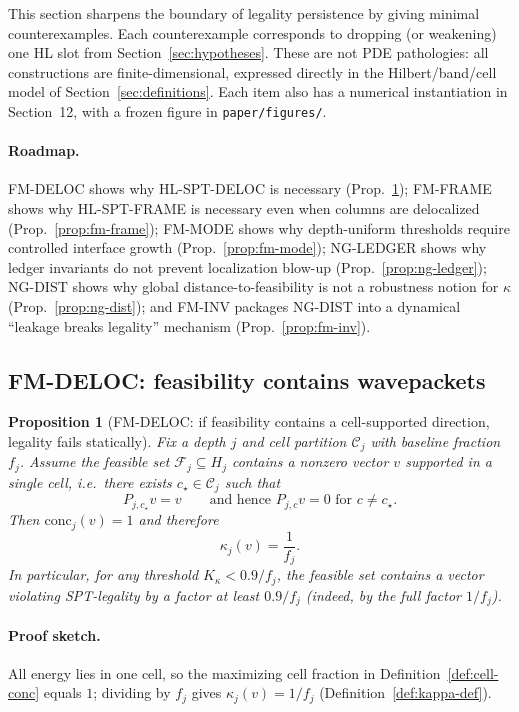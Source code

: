 \documentclass[11pt]{article}
\newcommand{\conc}{\mathrm{conc}}
\newtheorem{proposition}[definition]{Proposition}
\begin{document}
This section sharpens the boundary of legality persistence by giving minimal counterexamples.
Each counterexample corresponds to dropping (or weakening) one HL slot from Section~\ref{sec:hypotheses}.
These are not PDE pathologies: all constructions are finite-dimensional, expressed directly in the Hilbert/band/\allowbreak cell model of Section~\ref{sec:definitions}.
Each item also has a numerical instantiation in Section~12, with a frozen figure in \texttt{paper/figures/}.

\paragraph{Roadmap.}
FM-DELOC shows why HL-SPT-DELOC is necessary (Prop.~\ref{prop:fm-deloc});
FM-FRAME shows why HL-SPT-FRAME is necessary even when columns are delocalized (Prop.~\ref{prop:fm-frame});
FM-MODE shows why depth-uniform thresholds require controlled interface growth (Prop.~\ref{prop:fm-mode});
NG-LEDGER shows why ledger invariants do not prevent localization blow-up (Prop.~\ref{prop:ng-ledger});
NG-DIST shows why global distance-to-feasibility is not a robustness notion for $\kappa$ (Prop.~\ref{prop:ng-dist});
and FM-INV packages NG-DIST into a dynamical ``leakage breaks legality'' mechanism (Prop.~\ref{prop:fm-inv}).

\subsection{FM-DELOC: feasibility contains wavepackets}

\begin{proposition}[FM-DELOC: if feasibility contains a cell-supported direction, legality fails statically]\label{prop:fm-deloc}
Fix a depth $j$ and cell partition $\mathcal{C}_j$ with baseline fraction $f_j$.
Assume the feasible set $\mathcal{F}_j\subseteq H_j$ contains a nonzero vector $v$ supported in a single cell, i.e.\ there exists $c_\star\in\mathcal{C}_j$ such that
\[
P_{j,c_\star}v=v
\qquad \text{and hence } P_{j,c}v=0 \text{ for } c\neq c_\star.
\]
Then $\conc_j(v)=1$ and therefore
\[
\kappa_j(v)=\frac{1}{f_j}.
\]
In particular, for any threshold $K_\kappa<0.9/f_j$, the feasible set contains a vector violating SPT-legality by a factor at least $0.9/f_j$ (indeed, by the full factor $1/f_j$).
\end{proposition}

\paragraph{Proof sketch.}
All energy lies in one cell, so the maximizing cell fraction in Definition~\ref{def:cell-conc} equals $1$; dividing by $f_j$ gives $\kappa_j(v)=1/f_j$ (Definition~\ref{def:kappa-def}).
\end{document}
